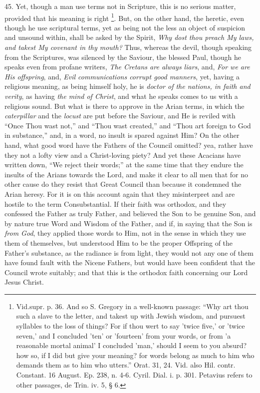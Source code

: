 45. Yet, though a man use
terms not in Scripture, this is no serious matter, provided that his
meaning is right \footnote{Vid.\emph{}supr. p. 36. And so S. Gregory in a well-known passage: ``Why
art thou such a slave to the letter, and takest up with Jewish wisdom,
and pursuest syllables to the loss of things? For if thou wert to say
'twice five,' or 'twice seven,' and I concluded 'ten' or 'fourteen'
from your words, or from 'a reasonable mortal animal' I concluded
'man,' should I seem to you absurd? how so, if I did but give your
meaning? for words belong as much to him who demands them as to him
who utters.'' Orat. 31, 24. Vid. also Hil. contr. Constant. 16 August.
Ep. 238, n. 4-6. Cyril. Dial. i. p. 301. Petavius refers to other
passages, de Trin. iv. 5, § 6.}. But,
on the other hand, the heretic, even though he use scriptural terms,
yet as being not the less an object of suspicion and unsound within,
shall be asked by the Spirit, \emph{Why dost thou preach My laws, and
takest My covenant in thy mouth?} Thus, whereas the devil, though
speaking from the Scriptures, was silenced by the Saviour, the blessed
Paul, though he speaks even from profane writers, \emph{The Cretans are
always liars}, and, \emph{For we are His offspring}, and, \emph{Evil
communications corrupt good manners}, yet, having a religious
meaning, as being himself holy, he is \emph{doctor of the nations, in
faith and verity}, as having \emph{the mind of Christ}, and what he
speaks comes to us with a religious sound. But what is there to
approve in the Arian terms, in which the \emph{caterpillar} and the \emph{locust}
are put before the Saviour, and He is reviled with ``Once Thou wast
not,'' and ``Thou wast created,'' and ``Thou art foreign to God in substance,'' and, in a word, no insult is spared against Him? On the
other hand, what good word have the Fathers of the Council omitted?
yea, rather have they not a lofty view and a Christ-loving piety? And
yet these Acacians have written down, ``We reject their words;'' at the
same time that they endure the insults of the Arians towards the Lord,
and make it clear to all men that for no other cause do they resist
that Great Council than because it condemned the Arian heresy. For it
is on this account again that they misinterpret and are hostile to the
term Consubstantial. If their faith was orthodox, and they confessed
the Father as truly Father, and believed the Son to be genuine Son,
and by nature true Word and Wisdom of the Father, and if, in saying
that the Son is \emph{from God}, they applied those words to Him, not
in the sense in which they use them of themselves, but understood Him
to be the proper Offspring of the Father's substance, as the radiance
is from light, they would not any one of them have found fault with
the Nicene Fathers, but would have been confident that the Council
wrote suitably; and that this is the orthodox faith concerning our
Lord Jesus Christ.

